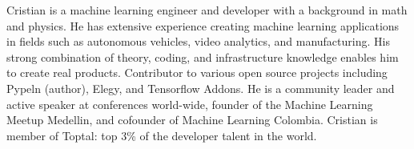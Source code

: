 \small{Cristian is a machine learning engineer and developer with a background in math and physics. He has extensive experience creating machine learning applications in fields such as autonomous vehicles, video analytics, and manufacturing. His strong combination of theory, coding, and infrastructure knowledge enables him to create real products. Contributor to various open source projects including Pypeln (author), Elegy, and Tensorflow Addons. He is a community leader and active speaker at conferences world-wide, founder of the Machine Learning Meetup Medellin, and cofounder of Machine Learning Colombia. Cristian is member of Toptal: top 3\% of the developer talent in the world.}
